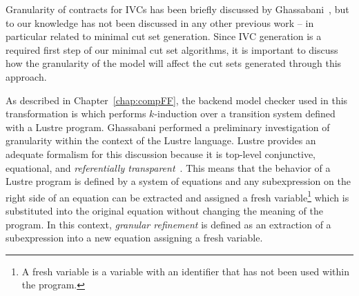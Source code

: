 Granularity of contracts for IVCs has been briefly discussed by Ghassabani~\cite{ghassabani_2018}, but to our knowledge has not been discussed in any other previous work -- in particular related to minimal cut set generation. Since IVC generation is a required first step of our minimal cut set algorithms, it is important to discuss how the granularity of the model will affect the cut sets generated through this approach. 

As described in Chapter~\ref{chap:compFF}, the backend model checker used in this transformation is \jkind which performs $k$-induction over a transition system defined with a Lustre program. Ghassabani performed a preliminary investigation of granularity within the context of the Lustre language. Lustre provides an adequate formalism for this discussion because it is top-level conjunctive, equational, and \textit{referentially transparent}~\cite{Halbwachs91:IEEE}. This means that the behavior of a Lustre program is defined by a system of equations and any subexpression on the right side of an equation can be extracted and assigned a fresh variable\footnote{A fresh variable is a variable with an identifier that has not been used within the program.} which is substituted into the original equation without changing the meaning of the program. In this context, \textit{granular refinement} is defined as an extraction of a subexpression into a new equation assigning a fresh variable. 



